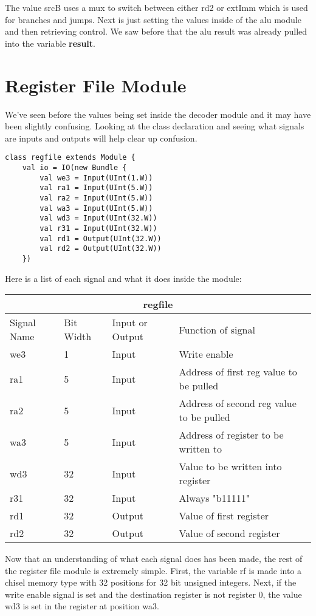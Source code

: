 \documentclass[12pt, letterpaper]{report}
\begin{document}
The value srcB uses a mux to switch between either rd2 or extImm which is used for branches and jumps.
Next is just setting the values inside of the alu module and then retrieving control. We saw before that
the alu result was already pulled into the variable \textbf{result}.

\pagebreak
\section{Register File Module}
We've seen before the values being set inside the decoder module and it may have been slightly confusing.
Looking at the class declaration and seeing what signals are inputs and outputs will help clear up confusion.


\begin{lstlisting}[style=scala]
   class regfile extends Module {
    val io = IO(new Bundle {
        val we3 = Input(UInt(1.W))
        val ra1 = Input(UInt(5.W))
        val ra2 = Input(UInt(5.W))
        val wa3 = Input(UInt(5.W))
        val wd3 = Input(UInt(32.W))
        val r31 = Input(UInt(32.W))
        val rd1 = Output(UInt(32.W))
        val rd2 = Output(UInt(32.W))
    })
\end{lstlisting}
Here is a list of each signal and what it does inside the module: \newline
\begin{tabular}{ |p{1cm}||p{1cm}|p{2cm}|p{7cm}|  }
   \hline
   \multicolumn{4}{|c|}{regfile} \\
   \hline
   Signal Name & Bit Width & Input or Output & Function of signal\\
   \hline
   we3    & 1   & Input  & Write enable\\
   ra1    & 5   & Input  & Address of first reg value to be pulled\\
   ra2    & 5   & Input  & Address of second reg value to be pulled\\
   wa3    & 5   & Input  & Address of register to be written to\\
   wd3    & 32  & Input  & Value to be written into register\\
   r31    & 32  & Input  & Always "b11111"\\
   rd1    & 32  & Output & Value of first register\\
   rd2    & 32  & Output & Value of second register\\
   \hline
  \end{tabular}
\newline \newline
Now that an understanding of what each signal does has been made, the rest of the register file module
is extremely simple. First, the variable rf is made into a chisel memory type with 32 positions for 32
bit unsigned integers. Next, if the write enable signal is set and the destination register is not register 0,
the value wd3 is set in the register at position wa3. \pagebreak
\end{document}
